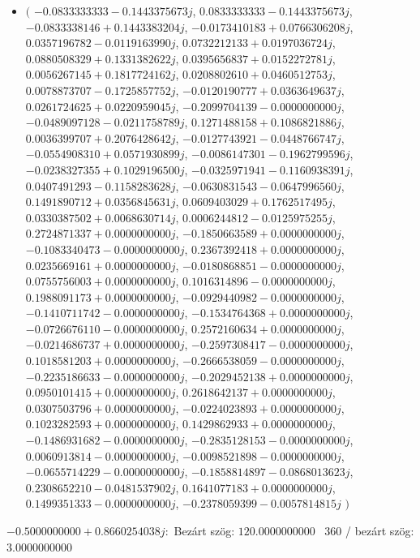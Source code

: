 \documentclass[14pt,a4paper]{article}
\begin{document}
\begin{itemize}
\item
$\big($
$-0.0833333333-0.1443375673j$, $0.0833333333-0.1443375673j$, $-0.0833338146+0.1443383204j$, $-0.0173410183+0.0766306208j$, $0.0357196782-0.0119163990j$, $0.0732212133+0.0197036724j$, $0.0880508329+0.1331382622j$, $0.0395656837+0.0152272781j$, $0.0056267145+0.1817724162j$, $0.0208802610+0.0460512753j$, $0.0078873707-0.1725857752j$, $-0.0120190777+0.0363649637j$, $0.0261724625+0.0220959045j$, $-0.2099704139-0.0000000000j$, $-0.0489097128-0.0211758789j$, $0.1271488158+0.1086821886j$, $0.0036399707+0.2076428642j$, $-0.0127743921-0.0448766747j$, $-0.0554908310+0.0571930899j$, $-0.0086147301-0.1962799596j$, $-0.0238327355+0.1029196500j$, $-0.0325971941-0.1160938391j$, $0.0407491293-0.1158283628j$, $-0.0630831543-0.0647996560j$, $0.1491890712+0.0356845631j$, $0.0609403029+0.1762517495j$, $0.0330387502+0.0068630714j$, $0.0006244812-0.0125975255j$, $0.2724871337+0.0000000000j$, $-0.1850663589+0.0000000000j$, $-0.1083340473-0.0000000000j$, $0.2367392418+0.0000000000j$, $0.0235669161+0.0000000000j$, $-0.0180868851-0.0000000000j$, $0.0755756003+0.0000000000j$, $0.1016314896-0.0000000000j$, $0.1988091173+0.0000000000j$, $-0.0929440982-0.0000000000j$, $-0.1410711742-0.0000000000j$, $-0.1534764368+0.0000000000j$, $-0.0726676110-0.0000000000j$, $0.2572160634+0.0000000000j$, $-0.0214686737+0.0000000000j$, $-0.2597308417-0.0000000000j$, $0.1018581203+0.0000000000j$, $-0.2666538059-0.0000000000j$, $-0.2235186633-0.0000000000j$, $-0.2029452138+0.0000000000j$, $0.0950101415+0.0000000000j$, $0.2618642137+0.0000000000j$, $0.0307503796+0.0000000000j$, $-0.0224023893+0.0000000000j$, $0.1023282593+0.0000000000j$, $0.1429862933+0.0000000000j$, $-0.1486931682-0.0000000000j$, $-0.2835128153-0.0000000000j$, $0.0060913814-0.0000000000j$, $-0.0098521898-0.0000000000j$, $-0.0655714229-0.0000000000j$, $-0.1858814897-0.0868013623j$, $0.2308652210-0.0481537902j$, $0.1641077183+0.0000000000j$, $0.1499351333-0.0000000000j$, $-0.2378059399-0.0057814815j$
$\big)$
\end{itemize}
$-0.5000000000+0.8660254038j$:\
Bezárt szög: $120.0000000000$ \
360 / bezárt szög: $3.0000000000$\
\end{document}
